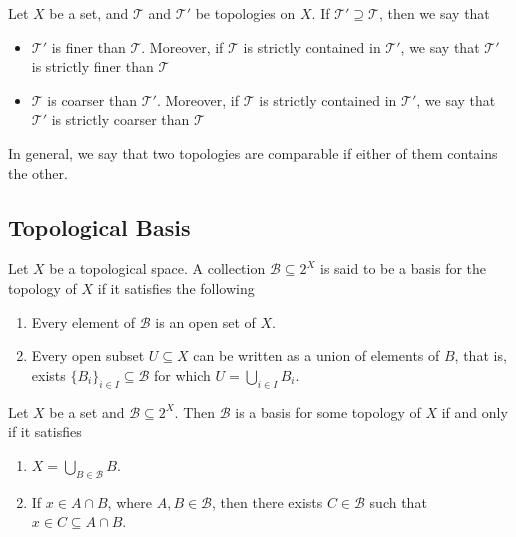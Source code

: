 \begin{definition}
\label{def:coarser-finer-topology}
Let \(X\) be a set, and \(\mathcal T\) and \(\mathcal T'\) be topologies on
\(X\). If \(\mathcal T' \supseteq \mathcal T\), then we say that
\begin{itemize}\setlength\itemsep{0em}
\item \(\mathcal T'\) is finer than \(\mathcal T\). Moreover, if \(\mathcal T\)
  is strictly contained in \(\mathcal T'\), we say that \(\mathcal T'\) is
  strictly finer than \(\mathcal T\)

\item \(\mathcal T\) is coarser than \(\mathcal T'\). Moreover, if \(\mathcal T\)
  is strictly contained in \(\mathcal T'\), we say that \(\mathcal T'\) is
  strictly coarser than \(\mathcal T\)
\end{itemize}
In general, we say that two topologies are comparable if either of them contains
the other.
\end{definition}

\subsection{Topological Basis}

\begin{definition}[Basis]\label{def: base}
Let \(X\) be a topological space. A collection \(\mathcal B \subseteq 2^X\) is
said to be a basis for the topology of \(X\) if it satisfies the following
\begin{enumerate}[(B1)]\setlength\itemsep{0em}
  \item Every element of \(\mathcal B\) is an open set of \(X\).
  \item Every open subset \(U \subseteq X\) can be written as a union of
    elements of \(B\), that is, exists \(\{B_i\}_{i \in I} \subseteq \mathcal
    B\) for which \(U = \bigcup_{i \in  I} B_i\).
\end{enumerate}
\end{definition}

\begin{proposition}
\label{prop:equivalent-basis}
Let \(X\) be a set and \(\mathcal B \subseteq 2^X\). Then \(\mathcal B\) is a
basis for some topology of \(X\) if and only if it satisfies
\begin{enumerate}[B1]\setlength\itemsep{0em}
\item\label{item:basis-union-property}
  \(X = \bigcup_{B \in \mathcal B} B\).

\item\label{item:basis-intersection-property}
  If \(x \in A \cap B\), where \(A, B \in \mathcal B\), then there exists
  \(C \in \mathcal B\) such that \(x \in C \subseteq A \cap B\).
\end{enumerate}
\end{proposition}

